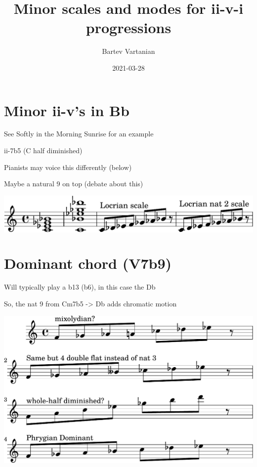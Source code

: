 \documentclass[11pt]{article}
\author{Bartev Vartanian}
\date{2021-03-28}
\title{Minor scales and modes for ii-v-i progressions}
\begin{document}
\maketitle


\section*{Minor ii-v's in Bb}
\label{sec:org97f04c6}

See Softly in the Morning Sunrise for an example

ii-7b5 (C half diminished)

Pianists may voice this differently (below)

Maybe a natural 9 on top (debate about this)

\begin{center}
\includegraphics[width=.9\linewidth]{min_ii_v_Bb.pdf}
\end{center}

\section*{Dominant chord (V7b9)}
\label{sec:org4835729}

Will typically play a b13 (b6), in this case the Db

So, the nat 9 from Cm7b5 -> Db adds chromatic motion

\begin{center}
\includegraphics[width=.9\linewidth]{min_ii_v_Bb-dom.pdf}
\end{center}
\end{document}
